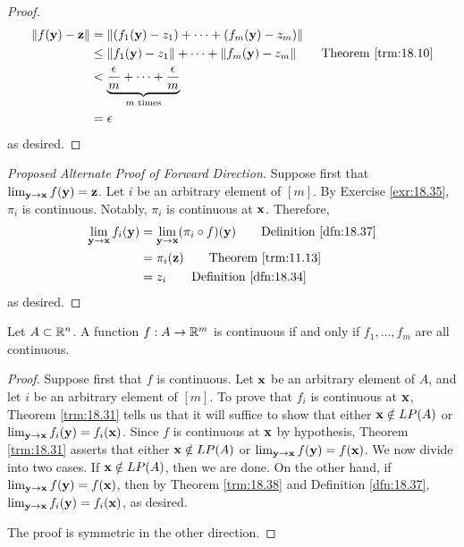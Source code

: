 \documentclass[../main.tex]{subfiles}
\begin{document}
\begin{theorem}
\begin{proof}
\begin{align*}
            \norm{f(\y)-\z} &= \norm{(f_1(\y)-z_1)+\cdots+(f_m(\y)-z_m)}\\
            &\leq \norm{f_1(\y)-z_1}+\cdots+\norm{f_m(\y)-z_m}\tag*{Theorem \ref{trm:18.10}}\\
            &< \underbrace{\frac{\epsilon}{m}+\cdots+\frac{\epsilon}{m}}_{m\text{ times}}\\
            &= \epsilon
        \end{align*}
        as desired.
    \end{proof}
    \begin{proof}[Proposed Alternate Proof of Forward Direction]
        Suppose first that $\lim_{\mathbf{y}\to\mathbf{x}}f(\mathbf{y})=\mathbf{z}$. Let $i$ be an arbitrary element of $[m]$. By Exercise \ref{exr:18.35}, $\pi_i$ is continuous. Notably, $\pi_i$ is continuous at $\mathbf{x}$. Therefore,
        \begin{align*}
            \lim_{\y\to\x}f_i(\y) &= \lim_{\y\to\x}(\pi_i\circ f)(\y)\tag*{Definition \ref{dfn:18.37}}\\
            &= \pi_i(\z)\tag*{Theorem \ref{trm:11.13}}\\
            &= z_i\tag*{Definition \ref{dfn:18.34}}
        \end{align*}
        as desired.
    \end{proof}
\end{theorem}

\begin{corollary}\label{cly:18.39}
    Let $A\subset\mathbb{R}^n$. A function $f:A\to\mathbb{R}^m$ is continuous if and only if $f_1,\dots,f_m$ are all continuous.
    \begin{proof}
        Suppose first that $f$ is continuous. Let $\mathbf{x}$ be an arbitrary element of $A$, and let $i$ be an arbitrary element of $[m]$. To prove that $f_i$ is continuous at $\mathbf{x}$, Theorem \ref{trm:18.31} tells us that it will suffice to show that either $\mathbf{x}\notin LP(A)$ or $\lim_{\mathbf{y}\to\mathbf{x}}f_i(\mathbf{y})=f_i(\mathbf{x})$. Since $f$ is continuous at $\mathbf{x}$ by hypothesis, Theorem \ref{trm:18.31} asserts that either $\mathbf{x}\notin LP(A)$ or $\lim_{\mathbf{y}\to\mathbf{x}}f(\mathbf{y})=f(\mathbf{x})$. We now divide into two cases. If $\mathbf{x}\notin LP(A)$, then we are done. On the other hand, if $\lim_{\mathbf{y}\to\mathbf{x}}f(\mathbf{y})=f(\mathbf{x})$, then by Theorem \ref{trm:18.38} and Definition \ref{dfn:18.37}, $\lim_{\mathbf{y}\to\mathbf{x}}f_i(\mathbf{y})=f_i(\mathbf{x})$, as desired.\par
        The proof is symmetric in the other direction.
    \end{proof}
\end{corollary}
\end{document}
